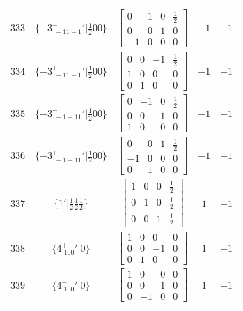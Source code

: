 \documentclass[fleqn,8pt]{jsarticle}
\begin{document}
\begin{longtable}{ccccc}
$ 333 $ & $ \{-3^{-}_{\,\,-11-1}{}'|\frac{1}{2} 0 0\} $ & $ \begin{bmatrix} 0 & 1 & 0 & \frac{1}{2} \\ 0 & 0 & 1 & 0 \\ -1 & 0 & 0 & 0 \end{bmatrix} $ & $ -1 $ & $ -1 $ \\ \hline
$ 334 $ & $ \{-3^{+}_{\,\,-11-1}{}'|\frac{1}{2} 0 0\} $ & $ \begin{bmatrix} 0 & 0 & -1 & \frac{1}{2} \\ 1 & 0 & 0 & 0 \\ 0 & 1 & 0 & 0 \end{bmatrix} $ & $ -1 $ & $ -1 $ \\ \hline
$ 335 $ & $ \{-3^{-}_{\,\,-1-11}{}'|\frac{1}{2} 0 0\} $ & $ \begin{bmatrix} 0 & -1 & 0 & \frac{1}{2} \\ 0 & 0 & 1 & 0 \\ 1 & 0 & 0 & 0 \end{bmatrix} $ & $ -1 $ & $ -1 $ \\ \hline
$ 336 $ & $ \{-3^{+}_{\,\,-1-11}{}'|\frac{1}{2} 0 0\} $ & $ \begin{bmatrix} 0 & 0 & 1 & \frac{1}{2} \\ -1 & 0 & 0 & 0 \\ 0 & 1 & 0 & 0 \end{bmatrix} $ & $ -1 $ & $ -1 $ \\ \hline
$ 337 $ & $ \{1{}'|\frac{1}{2} \frac{1}{2} \frac{1}{2}\} $ & $ \begin{bmatrix} 1 & 0 & 0 & \frac{1}{2} \\ 0 & 1 & 0 & \frac{1}{2} \\ 0 & 0 & 1 & \frac{1}{2} \end{bmatrix} $ & $ 1 $ & $ -1 $ \\ \hline
$ 338 $ & $ \{4^{+}_{\,\,100}{}'|0\} $ & $ \begin{bmatrix} 1 & 0 & 0 & 0 \\ 0 & 0 & -1 & 0 \\ 0 & 1 & 0 & 0 \end{bmatrix} $ & $ 1 $ & $ -1 $ \\ \hline
$ 339 $ & $ \{4^{-}_{\,\,100}{}'|0\} $ & $ \begin{bmatrix} 1 & 0 & 0 & 0 \\ 0 & 0 & 1 & 0 \\ 0 & -1 & 0 & 0 \end{bmatrix} $ & $ 1 $ & $ -1 $ \\ \hline

\end{longtable}
\end{document}
